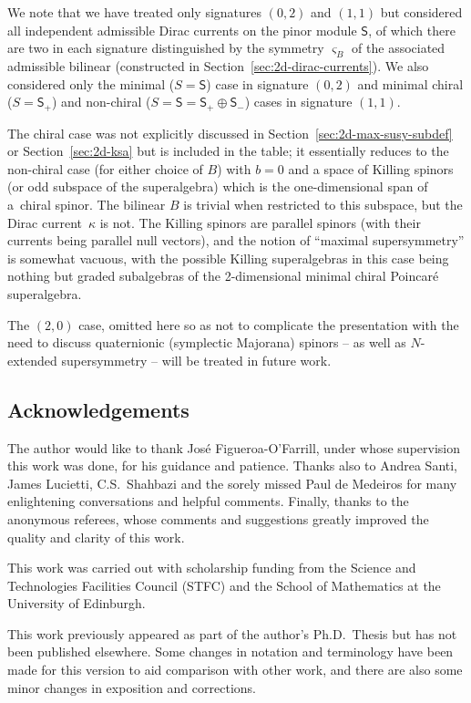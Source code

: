 \documentclass[pdftex]{sigma}
\numberwithin{equation}{section}
\newcommand{\ssS}{\mathsf{S}}
\newcommand{\1}{\mathbbm{1}}
\begin{document}
We note that we have treated only signatures $(0,2)$ and $(1,1)$ but considered all independent admissible Dirac currents on the pinor module $\ssS$, of which there are two in each signature distinguished by the symmetry $\varsigma_B$ of the associated admissible bilinear (constructed in Section~\ref{sec:2d-dirac-currents}). We also considered only the minimal ($S=\ssS$) case in signature $(0,2)$ and minimal chiral ($S=\ssS_+$) and non-chiral ($S=\ssS=\ssS_+\oplus\ssS_-$) cases in signature $(1,1)$.

The chiral case was not explicitly discussed in Section~\ref{sec:2d-max-susy-subdef} or Section~\ref{sec:2d-ksa} but is included in the table; it essentially reduces to the non-chiral case (for either choice of $B$) with $b=0$ and a space of Killing spinors (or odd subspace of the superalgebra) which is the one-dimensional span of a~chiral spinor. The bilinear $B$ is trivial when restricted to this subspace, but the Dirac current~$\kappa$ is not. The Killing spinors are parallel spinors (with their currents being parallel null vectors), and the notion of ``maximal supersymmetry'' is somewhat vacuous, with the possible Killing superalgebras in this case being nothing but graded subalgebras of the 2-dimensional minimal chiral Poincar\'e superalgebra.

The $(2,0)$ case, omitted here so as not to complicate the presentation with the need to discuss quaternionic (symplectic Majorana) spinors -- as well as $N$-extended supersymmetry -- will be treated in future work.

\subsection*{Acknowledgements}

The author would like to thank Jos\'e Figueroa-O'Farrill, under whose supervision this work was done, for his guidance and patience. Thanks also to Andrea Santi, James Lucietti, C.S.~Shahbazi and the sorely missed Paul de Medeiros for many enlightening conversations and helpful comments. Finally, thanks to the anonymous referees, whose comments and suggestions greatly improved the quality and clarity of this work.

This work was carried out with scholarship funding from the Science and Technologies Facilities Council (STFC) and the School of Mathematics at the University of Edinburgh.

This work previously appeared as part of the author's Ph.D.~Thesis \cite{Beckett2024} but has not been published elsewhere. Some changes in notation and terminology have been made for this version to aid comparison with other work, and there are also some minor changes in exposition and corrections.
\end{document}

